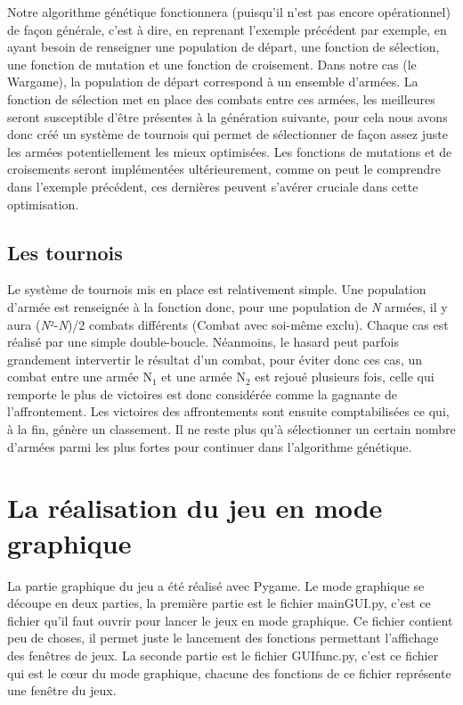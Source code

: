 \documentclass{article}
\begin{document}
		Notre algorithme génétique fonctionnera (puisqu'il n'est pas encore opérationnel) de façon générale, c'est à dire, en reprenant l'exemple précédent par exemple, en ayant besoin de renseigner une population de départ, une fonction de sélection, une fonction de mutation et une fonction de croisement. Dans notre cas (le Wargame), la population de départ correspond à un ensemble d'armées. La fonction de sélection met en place des combats entre ces armées, les meilleures seront susceptible d'être présentes à la génération suivante, pour cela nous avons donc créé un système de tournois qui permet de sélectionner de façon assez juste les armées potentiellement les mieux optimisées. Les fonctions de mutations et de croisements seront implémentées ultérieurement, comme on peut le comprendre dans l'exemple précédent, ces dernières peuvent s'avérer cruciale dans cette optimisation.

	\subsection{Les tournois}
		Le système de tournois mis en place est relativement simple. Une population d'armée est renseignée à la fonction donc, pour une population de \textit{N} armées, il y aura (\textit{N}²-\textit{N})/2 combats différents (Combat avec soi-même exclu). Chaque cas est réalisé par une simple double-boucle. Néanmoins, le hasard peut parfois grandement intervertir le résultat d'un combat, pour éviter donc ces cas, un combat entre une armée \textit{$\textrm{N}_\textrm{1}$} et une armée \textit{\textit{$\textrm{N}_\textrm{2}$}} est rejoué plusieurs fois, celle qui remporte le plus de victoires est donc considérée comme la gagnante de l'affrontement. Les victoires des affrontements sont ensuite comptabilisées ce qui, à la fin, génère un classement. Il ne reste plus qu'à sélectionner un certain nombre d'armées parmi les plus fortes pour continuer dans l'algorithme génétique.

\section{La réalisation du jeu en mode graphique}
	La partie graphique du jeu a été réalisé avec Pygame. Le mode graphique se découpe en deux parties, la première partie est le fichier mainGUI.py, c'est ce fichier qu'il faut ouvrir pour lancer le jeux en mode graphique. Ce fichier contient peu de choses, il permet juste le lancement des fonctions permettant l'affichage des fenêtres de jeux. La seconde partie est le fichier GUIfunc.py, c'est ce fichier qui est le cœur du mode graphique, chacune des fonctions de ce fichier représente une fenêtre du jeux.
	
\end{document}
